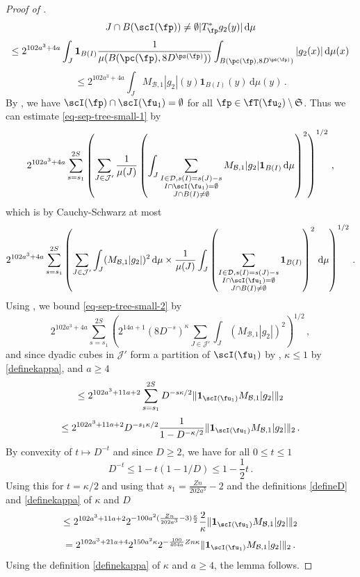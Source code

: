 \begin{proof}[Proof of ]
$${{        J \cap B(\scI(\fp)) \ne \emptyset}} |T_{\fp}^* g_2(y)| \, \mathrm{d}\mu
    $$
    $$
        \le 2^{102a^3+4a} \int_J \mathbf{1}_{B(I)} \frac{1}{\mu(B(\pc(\fp), 8D^{\ps(\fp)}))} \int_{B(\pc(\fp), 8D^{\ps(\fp)})} |g_2(x)| \, \mathrm{d}\mu(x)
    $$
    $$
        \le 2^{102a^3+4a} \int_J M_{\mathcal{B},1} |g_2|(y) \mathbf{1}_{B(I)}(y) \, \mathrm{d}\mu(y)\,.
    $$
    By , we have $\scI(\fp) \cap \scI(\fu_1) = \emptyset$ for all $\fp \in \fT(\fu_2) \setminus \mathfrak{S}$.
    Thus we can estimate \eqref{eq-sep-tree-small-1} by
    $$
        2^{102a^3+4a} \sum_{s=s_1}^{2S} \left( \sum_{J \in \mathcal{J}'} \frac{1}{\mu(J)} \left(\int_J \sum_{\substack{I \in \mathcal{D}, s(I) = s(J) - s\\ I \cap \scI(\fu_1) = \emptyset\\
        J \cap B(I) \ne \emptyset}} M_{\mathcal{B},1} |g_2| \mathbf{1}_{B(I)} \, \mathrm{d}\mu \right)^2\right)^{1/2}\,,
    $$
    which is by Cauchy-Schwarz at most
    \begin{equation}
    \label{eq-sep-tree-small-2}
        2^{102a^3+4a} \sum_{s=s_1}^{2S} \left( \sum_{J \in \mathcal{J}'} \int_J ( M_{\mathcal{B},1} |g_2|)^2 \, \mathrm{d}\mu \times
        \frac{1}{\mu(J)} \int_J \left(\sum_{\substack{I \in \mathcal{D}, s(I) = s(J) - s\\ I \cap \scI(\fu_1) = \emptyset\\
        J \cap B(I) \ne \emptyset}} \mathbf{1}_{B(I)}\right)^2 \, \mathrm{d}\mu \right)^{1/2}\,.
    \end{equation}
    Using , we bound \eqref{eq-sep-tree-small-2} by
    $$
        2^{102a^3+4a} \sum_{s=s_1}^{2S} \left(2^{14a+1} (8 D^{-s})^\kappa \sum_{J \in \mathcal{J}'} \int_J (M_{\mathcal{B},1} |g_2|)^2\right)^{1/2}\,,
    $$
    and since dyadic cubes in $\mathcal{J}'$ form a partition of $\scI(\fu_1)$ by , $\kappa \le 1$ by \eqref{definekappa}, and $a \ge 4$
    $$
        \le 2^{102a^3+11a+2} \sum_{s=s_1}^{2S} D^{-s\kappa/2} \|\mathbf{1}_{\scI(\fu_1)} M_{\mathcal{B},1} |g_2|\|_2
    $$
    $$
        \le 2^{102a^3+11a+2} D^{-s_1 \kappa /2} \frac{1}{1 - D^{-\kappa/2}} \|\mathbf{1}_{\scI(\fu_1)} M_{\mathcal{B},1} |g_2|\|_2\,.
    $$
    By convexity of $t \mapsto D^{-t}$ and since $D \ge 2$, we have for all $0 \le t \le 1$
    $$
        D^{-t} \le 1 - t(1 - 1/D) \le 1 - \frac{1}{2}t\,.
    $$
    Using this for $t = \kappa/2$ and using that $s_1 = \frac{Zn}{202a^3} - 2$ and the definitions \eqref{defineD} and \eqref{definekappa} of $\kappa$ and $D$
    $$
        \le 2^{102a^3+11a+2} 2^{-100a^2(\frac{Zn}{202a^3} - 3) \frac{\kappa}{2}} \frac{2}{\kappa} \|\mathbf{1}_{\scI(\fu_1)} M_{\mathcal{B},1} |g_2|\|_2
    $$
    $$
        = 2^{102a^3+21a+4} 2^{150a^2\kappa} 2^{-\frac{100}{404a}Zn\kappa} \|\mathbf{1}_{\scI(\fu_1)} M_{\mathcal{B},1} |g_2|\|_2\,.
    $$
    Using the definition \eqref{definekappa} of $\kappa$ and $a \ge 4$, the lemma follows.
\end{proof}



